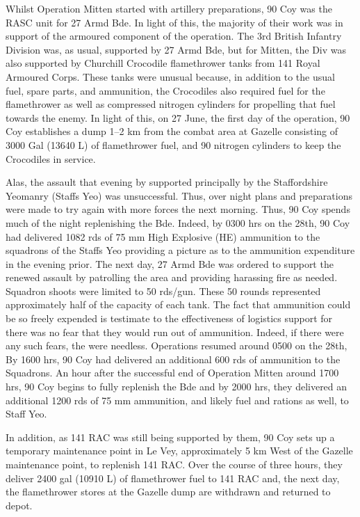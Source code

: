 \documentclass[noraggedright]{turabian-researchpaper}
\begin{document}
Whilst Operation Mitten started with artillery preparations, 90 Coy was the
RASC unit for 27 Armd Bde.  In light of this, the majority of their 
work was in support of the armoured component of the operation.  The 3rd
British Infantry Division was, as usual, supported by 27 Armd Bde, but for
Mitten, the Div was also supported by Churchill Crocodile flamethrower tanks
from 141 Royal Armoured Corps.  These tanks were unusual because, in addition
to the usual fuel, spare parts, and ammunition, the Crocodiles also required
fuel for the flamethrower as well as compressed nitrogen cylinders for 
propelling that fuel towards the enemy.  In light of this, on 27 June, the 
first day of the operation, 90 Coy establishes
a dump 1--2 km from the combat area at Gazelle consisting of 3000 Gal (13640 L)
of flamethrower fuel, and 90 nitrogen cylinders to keep the Crocodiles in
service.\autocite[27 June 1944]{90wd}

Alas, the assault that evening by %
supported principally by the Staffordshire Yeomanry (Staffs Yeo) %
was unsuccessful.  Thus, over night plans and preparations were made to try 
again with more forces the next morning.  Thus, 90 Coy spends much of the 
night replenishing the Bde.  Indeed, by 0300 hrs on the 28th, 90 Coy had 
delivered 1082 rds of 75 mm High Explosive (HE) ammunition to the squadrons
of the Staffs Yeo providing a picture as to the ammunition expenditure in the 
evening prior.  The next day, 27 Armd Bde was ordered to support the renewed
assault by patrolling the area and providing harassing fire as needed.  
Squadron shoots were limited to 50 rds/gun.\autocite[Operation Instruction 
No 2 (see June appendix)]{27wd}  These 50 rounds represented 
approximately half of the capacity of each tank.  
The fact that ammunition could be so freely expended is testimate to the 
effectiveness of logistics support for there was no fear that they would
run out of ammunition.  Indeed, if there were any such fears, the were 
needless.  Operations resumed around 0500 on the 28th, By 1600 hrs, 90 Coy 
had delivered an additional 600 rds of ammunition to the Squadrons. An hour 
after the successful end of Operation Mitten around 1700 hrs, 90 Coy begins
to fully replenish the Bde and by 2000 hrs, they delivered an additional 
1200 rds of 75 mm ammunition, and likely fuel and rations as well, to Staff 
Yeo.\autocite[28 June 1944]{90wd}

In addition, as 141 RAC was still being supported by them, 90 Coy sets up a 
temporary maintenance point in Le Vey, approximately 5 km West of the Gazelle 
maintenance point, to replenish 141 RAC.  Over the course of three hours, they
deliver 2400 gal (10910 L) of flamethrower fuel to 141 RAC and, the next
day, the flamethrower stores at the Gazelle dump are withdrawn and returned to 
depot.\autocite[28 -- 29 June 1944]{90wd} %
\end{document}
